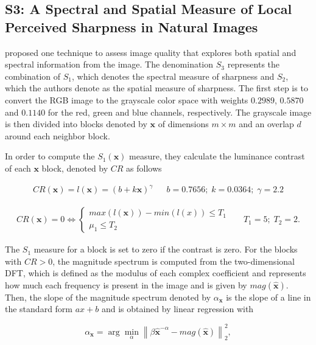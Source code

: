 \subsection{S3: A Spectral and Spatial Measure of Local Perceived Sharpness in Natural Images}

 proposed one technique to assess image quality that explores both spatial and spectral information from the image. The denomination $S_{3}$ represents the combination of $S_{1}$, which denotes the spectral measure of sharpness and $S_{2}$, which the authors denote as the spatial measure of sharpness. The first step is to convert the RGB image to the grayscale color space with weights $0.2989$, $0.5870$ and $0.1140$ for the red, green and blue channels, respectively. The grayscale image is then divided into blocks denoted by $\mathbf{x}$ of dimensions $m \times m$ and an overlap $d$ around each neighbor block.

In order to compute the $S_{1}(\mathbf{x})$ measure, they calculate the luminance contrast of each $\mathbf{x}$ block, denoted by $CR$ as follows

\begin{align}
\label{eqn:luminance_contrast}
CR(\mathbf{x}) = l(\mathbf{x}) = \left(b + k\mathbf{x}\right)^{\gamma}
&&
b = 0.7656;\; k = 0.0364;\; \gamma = 2.2
\end{align}

\begin{align*}
\label{eqn:contrast_constraints}
CR(\mathbf{x}) = 0 \iff
    \begin{cases}
        max(l(\mathbf{x})) - min(l(x)) \leq T_{1}\\
        \mu_{1} \leq T_{2}    
    \end{cases}
&&
T_{1} = 5;\; T_{2}= 2.
\end{align*}

\vspace{0.1in}

The $S_{1}$ measure for a block is set to zero if the contrast is zero. For the blocks with $CR > 0$, the magnitude spectrum is computed from the two-dimensional DFT, which is defined as the modulus of each complex coefficient and represents how much each frequency is present in the image and is given by $mag(\hat{\mathbf{x}})$. Then, the slope of the magnitude spectrum denoted by $\alpha_{\mathbf{x}}$ is the slope of a line in the standard form $ax + b$ and is obtained by linear regression with

\begin{equation}
\label{eqn:slope_of_magnitude}
\alpha_{\mathbf{x}} = \arg \min_{\alpha} \left\lVert \beta \hat{\mathbf{x}}^{-\alpha} -  mag(\hat{\mathbf{x}}) \right\rVert^{2}_{2},
\end{equation}

